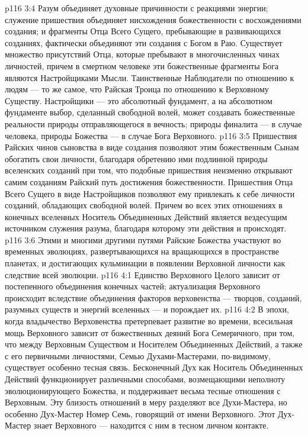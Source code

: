 \vs p116 3:4 \pc {}\bibnobreakspace {} Разум объединяет духовные причинности с реакциями энергии; служение пришествия объединяет нисхождения божественности с восхождениями создания; и фрагменты Отца Всего Сущего, пребывающие в развивающихся созданиях, фактически объединяют эти создания с Богом в Раю. Существует множество присутствий Отца, которые пребывают в многочисленных чинах личностей, причем в смертном человеке эти божественные фрагменты Бога являются Настройщиками Мысли. Таинственные Наблюдатели по отношению к людям --- то же самое, что Райская Троица по отношению к Верховному Существу. Настройщики --- это абсолютный фундамент, а на абсолютном фундаменте выбор, сделанный свободной волей, может создавать божественные реальности природы отправляющегося в вечность; природы финалита --- в случае человека, природы Божества --- в случае Бога Верховного.
\vs p116 3:5 \pc Пришествия Райских чинов сыновства в виде создания позволяют этим божественным Сынам обогатить свои личности, благодаря обретению ими подлинной природы вселенских созданий при том, что подобные пришествия неизменно открывают самим созданиям Райский путь достижения божественности. Пришествия Отца Всего Сущего в виде Настройщиков позволяют ему привлекать к себе личности созданий, обладающих свободной волей. Причем во всех этих отношениях в конечных вселенных Носитель Объединенных Действий является вездесущим источником служения разума, благодаря которому эти действия и происходят.
\vs p116 3:6 Этими и многими другими путями Райские Божества участвуют во временных эволюциях, развертывающихся на вращающихся в пространстве планетах, и достигающих кульминации в появлении Верховной личности как следствие всей эволюции.
\vs p116 4:1 Единство Верховного Целого зависит от постепенного объединения конечных частей; актуализация Верховного происходит вследствие объединения факторов верховенства --- творцов, созданий, разумных существ и энергий вселенных --- и порождает их.
\vs p116 4:2 \pc В эпохи, когда владычество Верховенства претерпевает развитие во времени, всесильная мощь Верховного зависит от божественных деяний Бога Семеричного, при том, что между Верховным Существом и Носителем Объединенных Действий, а также с его первичными личностями, Семью Духами\hyp{}Мастерами, по\hyp{}видимому, существует особенно тесная связь. Бесконечный Дух как Носитель Объединенных Действий функционирует различными способами, возмещающими неполноту эволюционирующего Божества, и поддерживает весьма тесные отношения с Верховным. Эту близость отношений в меру разделяют все Духи\hyp{}Мастера, но особенно Дух\hyp{}Мастер Номер Семь, говорящий от имени Верховного. Этот Дух\hyp{}Мастер знает Верховного --- находится с ним в тесном личном контакте.
